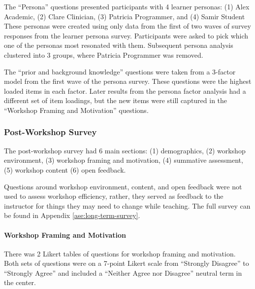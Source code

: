 \documentclass[030-workshop.tex]{subfiles}
\begin{document}
      The ``Persona'' questions presented participants with 4 learner personas:
      (1) Alex Academic,
      (2) Clare Clinician,
      (3) Patricia Programmer, and
      (4) Samir Student
      These personas were created using only data from the first of two waves of survey responses from the learner persona survey.
      Participants were asked to pick which one of the personas most resonated with them.
      Subsequent persona analysis clustered into 3 groups, where Patricia Programmer was removed.

      The ``prior and background knowledge'' questions were taken from
      a 3-factor model from the first wave of the persona survey. %
      These questions were the highest loaded items in each factor.
      Later results from the persona factor analysis had a different set of item loadings,
      but the new items were still captured in the ``Workshop Framing and Motivation'' questions.

  \subsubsection{Post-Workshop Survey}

      The post-workshop survey had 6 main sections:
      (1) demographics,
      (2) workshop environment,
      (3) workshop framing and motivation,
      (4) summative assessment,
      (5) workshop content
      (6) open feedback.

      Questions around workshop environment, content, and open feedback
      were not used to assess workshop efficiency,
      rather, they served as feedback to the instructor for things they may need to change while teaching.
      The full survey can be found in Appendix \ref{ase:long-term-survey}.

      \paragraph{Workshop Framing and Motivation}

          There was 2 Likert tables of questions for workshop framing and motivation.
          Both sets of questions were on a 7-point Likert scale from
          ``Strongly Disagree'' to ``Strongly Agree'' and
          included a ``Neither Agree nor Disagree'' neutral term in the center.
\end{document}
